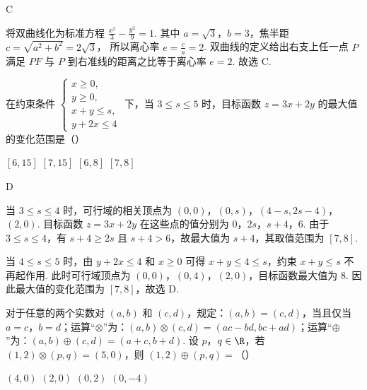 \begin{answer}
C
\end{answer}

\begin{solution}
将双曲线化为标准方程
\(\frac{x^2}{3}-\frac{y^2}{9}=1\).
其中 \(a=\sqrt{3}\)，\(b=3\)，焦半距
\(c=\sqrt{a^2+b^2}=2\sqrt{3}\)，
所以离心率 \(e=\frac{c}{a}=2\). 双曲线的定义给出右支上任一点 \(P\) 满足 \(PF\) 与 \(P\) 到右准线的距离之比等于离心率 \(e=2\).
故选 C.
\end{solution}

\begin{problem}
在约束条件 \(\begin{cases}
x \geqslant 0,\\
y \geqslant 0,\\
x + y \leqslant s,\\
y + 2x \leqslant 4
\end{cases}\) 下，当 \(3 \leqslant s \leqslant 5\) 时，目标函数 \(z = 3x + 2y\) 的最大值的变化范围是（\quad）

\choices
    {\([6, 15]\)}
    {\([7, 15]\)}
    {\([6, 8]\)}
    {\([7, 8]\)}
\end{problem}

\begin{answer}
D
\end{answer}

\begin{solution}
当 \(3\leqslant s\leqslant4\) 时，可行域的相关顶点为
\((0,0)\)，\((0,s)\)，\((4-s,2s-4)\)，\((2,0)\). 目标函数 \(z=3x+2y\) 在这些点的值分别为 \(0\)，\(2s\)，\(s+4\)，\(6\).
由于 \(3\leqslant s\leqslant4\)，有 \(s+4\geqslant2s\) 且 \(s+4>6\)，故最大值为 \(s+4\)，其取值范围为 \([7,8]\).

当 \(4\leqslant s\leqslant5\) 时，由 \(y+2x\leqslant4\) 和 \(x\geqslant0\) 可得 \(x+y\leqslant4\leqslant s\)，约束 \(x+y\leqslant s\) 不再起作用. 此时可行域顶点为 \((0,0)\)，\((0,4)\)，\((2,0)\)，目标函数最大值为 \(8\). 因此最大值的变化范围为 \([7,8]\)，故选 D.
\end{solution}

\begin{problem}
对于任意的两个实数对 \((a, b)\) 和 \((c, d)\)，规定：\((a, b) = (c, d)\)，当且仅当 \(a = c\)，\(b = d\)；运算“\(\otimes\)”为：\((a, b) \otimes (c, d) = (ac - bd, bc + ad)\)；运算“\(\oplus\)”为：\((a, b) \oplus (c, d) = (a + c, b + d)\). 设 \(p\)，\(q \in \R\)，若 \((1, 2) \otimes (p, q) = (5, 0)\)，则 \((1, 2) \oplus (p, q) =\)（\quad）

\choices
    {\((4, 0)\)}
    {\((2, 0)\)}
    {\((0, 2)\)}
    {\((0, -4)\)}
\end{problem}

